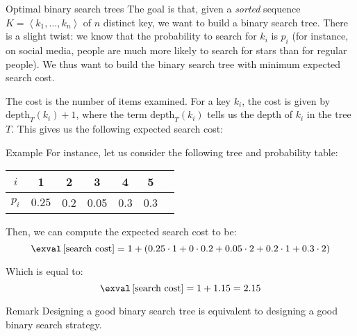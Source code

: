 \documentclass[a4paper]{article}
\begin{document}
\begin{parag}{Optimal binary search trees}
    The goal is that, given a \textit{sorted} sequence $K = \left\langle k_1, \ldots, k_n\right\rangle$ of $n$ distinct key, we want to build a binary search tree. There is a slight twist: we know that the probability to search for $k_i$ is $p_i$ (for instance, on social media, people are much more likely to search for stars than for regular people). We thus want to build the binary search tree with minimum expected search cost.

    The cost is the number of items examined. For a key $k_i$, the cost is given by $\text{depth}_T\left(k_i\right) + 1$, where the term $\text{depth}_T\left(k_i\right)$ tells us the depth of $k_i$ in the tree $T$. This gives us the following expected search cost: 
    
    \begin{subparag}{Example}
        For instance, let us consider the following tree and probability table:

        \begin{center}
        \begin{tabular}{c|cccccc}
            $i$ & 1 & 2 & 3 & 4 & 5 \\
            \hline
            $p_i$ & $0.25$ & 0.2 & 0.05 & 0.3 & 0.3
        \end{tabular}
        \end{center}

        Then, we can compute the expected search cost to be: 
        \[\exval \left[\text{search cost}\right] = 1 + \left(0.25\cdot 1 + 0\cdot 0.2 + 0.05\cdot 2 + 0.2\cdot 1 + 0.3\cdot 2\right)\]

        Which is equal to:
        \[\exval\left[\text{search cost}\right] = 1 + 1.15 = 2.15\]
    \end{subparag}

    \begin{subparag}{Remark}
        Designing a good binary search tree is equivalent to designing a good binary search strategy.
    \end{subparag}
    
\end{parag}
\end{document}
